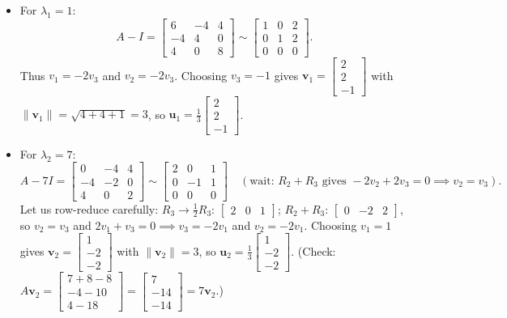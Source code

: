\documentclass[11pt, letterpaper]{article}
\theoremstyle{definition}
\theoremstyle{remark}
\begin{document}
\begin{itemize}
    \item For $\lambda_1 = 1$:
    \[
    A - I = \begin{bmatrix} 6 & -4 & 4 \\ -4 & 4 & 0 \\ 4 & 0 & 8 \end{bmatrix} \sim \begin{bmatrix} 1 & 0 & 2 \\ 0 & 1 & 2 \\ 0 & 0 & 0 \end{bmatrix}.
    \]
    Thus $v_1 = -2v_3$ and $v_2 = -2v_3$. Choosing $v_3 = -1$ gives $\mathbf{v}_1 = \begin{bmatrix} 2 \\ 2 \\ -1 \end{bmatrix}$ with $\|\mathbf{v}_1\| = \sqrt{4 + 4 + 1} = 3$, so $\mathbf{u}_1 = \frac{1}{3}\begin{bmatrix} 2 \\ 2 \\ -1 \end{bmatrix}$.
    \item For $\lambda_2 = 7$:
    \[
    A - 7I = \begin{bmatrix} 0 & -4 & 4 \\ -4 & -2 & 0 \\ 4 & 0 & 2 \end{bmatrix} \sim \begin{bmatrix} 2 & 0 & 1 \\ 0 & -1 & 1 \\ 0 & 0 & 0 \end{bmatrix} \quad (\text{wait: } R_2 + R_3 \text{ gives } -2v_2 + 2v_3 = 0 \implies v_2 = v_3).
    \]
    Let us row-reduce carefully:
    $R_3 \to \frac{1}{2}R_3$: $\begin{bmatrix} 2 & 0 & 1 \end{bmatrix}$; $R_2 + R_3$: $\begin{bmatrix} 0 & -2 & 2 \end{bmatrix}$, so $v_2 = v_3$ and $2v_1 + v_3 = 0 \implies v_3 = -2v_1$ and $v_2 = -2v_1$.
    Choosing $v_1 = 1$ gives $\mathbf{v}_2 = \begin{bmatrix} 1 \\ -2 \\ -2 \end{bmatrix}$ with $\|\mathbf{v}_2\| = 3$, so $\mathbf{u}_2 = \frac{1}{3}\begin{bmatrix} 1 \\ -2 \\ -2 \end{bmatrix}$. (Check: $A\mathbf{v}_2 = \begin{bmatrix} 7+8-8 \\ -4-10 \\ 4-18 \end{bmatrix} = \begin{bmatrix} 7 \\ -14 \\ -14 \end{bmatrix} = 7\mathbf{v}_2$.)

\end{itemize}
\end{document}

